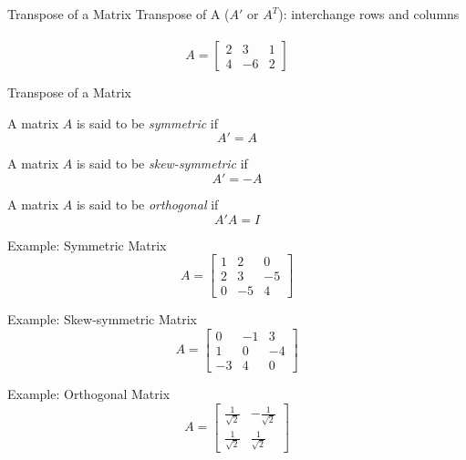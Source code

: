 \documentclass{./../../Latex/teaching_slides}
\begin{document}
\begin{frame}{Transpose of a Matrix}
Transpose of A  ($A'$ or $A^T$): interchange rows and columns \\~\\
$$A = \begin{bmatrix}
2 & 3 & 1 \\
4 & -6 & 2
\end{bmatrix}$$
\end{frame}

\begin{frame}{Transpose of a Matrix}
\begin{witemize}
\item A matrix $A$ is said to be \textit{symmetric} if $$A'=A$$
\item A matrix $A$ is said to be \textit{skew-symmetric} if $$A'=-A$$
\item A matrix $A$ is said to be \textit{orthogonal} if $$A'A=I$$
\end{witemize}
\end{frame}

\begin{frame}{Example: Symmetric Matrix}
$$
A=\left[\begin{array}{rrr}
1 & 2 & 0 \\
2 & 3 & -5 \\
0 & -5 & 4
\end{array}\right]
$$
\end{frame}

\begin{frame}{Example: Skew-symmetric Matrix}
$$
A=\left[\begin{array}{ccc}0 & -1 & 3 \\ 1 & 0 & -4 \\ -3 & 4 & 0\end{array}\right] 
$$
\end{frame}

\begin{frame}{Example: Orthogonal Matrix}
$$
A=\left[\begin{array}{cc}
\frac{1}{\sqrt{2}} & -\frac{1}{\sqrt{2}} \\
\frac{1}{\sqrt{2}} & \frac{1}{\sqrt{2}}
\end{array}\right]
$$
\end{frame}
\end{document}

